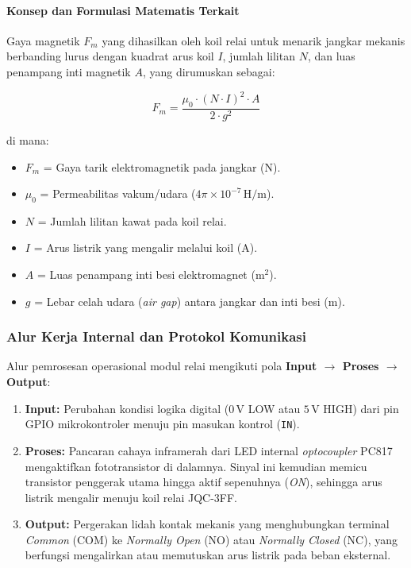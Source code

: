 \paragraph{Konsep dan Formulasi Matematis Terkait}
Gaya magnetik $F_m$ yang dihasilkan oleh koil relai untuk menarik jangkar mekanis berbanding lurus dengan kuadrat arus koil $I$, jumlah lilitan $N$, dan luas penampang inti magnetik $A$, yang dirumuskan sebagai:

\begin{equation}
	F_m = \frac{\mu_0 \cdot (N \cdot I)^2 \cdot A}{2 \cdot g^2}
	\label{eq:jqc3ff_gaya_magnet}
\end{equation}

\noindent di mana:
\begin{itemize}
	\item $F_m$ = Gaya tarik elektromagnetik pada jangkar ($\text{N}$).
	\item $\mu_0$ = Permeabilitas vakum/udara ($4\pi \times 10^{-7}\,\text{H/m}$).
	\item $N$ = Jumlah lilitan kawat pada koil relai.
	\item $I$ = Arus listrik yang mengalir melalui koil ($\text{A}$).
	\item $A$ = Luas penampang inti besi elektromagnet ($\text{m}^2$).
	\item $g$ = Lebar celah udara (\textit{air gap}) antara jangkar dan inti besi ($\text{m}$).
\end{itemize}

\subsubsection{Alur Kerja Internal dan Protokol Komunikasi}
Alur pemrosesan operasional modul relai mengikuti pola \textbf{Input $\rightarrow$ Proses $\rightarrow$ Output}:
\begin{enumerate}
	\item \textbf{Input:} Perubahan kondisi logika digital ($0\,\text{V}$ LOW atau $5\,\text{V}$ HIGH) dari pin GPIO mikrokontroler menuju pin masukan kontrol (\texttt{IN}).
	\item \textbf{Proses:} Pancaran cahaya inframerah dari LED internal \textit{optocoupler} PC817 mengaktifkan fototransistor di dalamnya. Sinyal ini kemudian memicu transistor penggerak utama hingga aktif sepenuhnya (\textit{ON}), sehingga arus listrik mengalir menuju koil relai JQC-3FF.
	\item \textbf{Output:} Pergerakan lidah kontak mekanis yang menghubungkan terminal \textit{Common} (COM) ke \textit{Normally Open} (NO) atau \textit{Normally Closed} (NC), yang berfungsi mengalirkan atau memutuskan arus listrik pada beban eksternal.
\end{enumerate}

